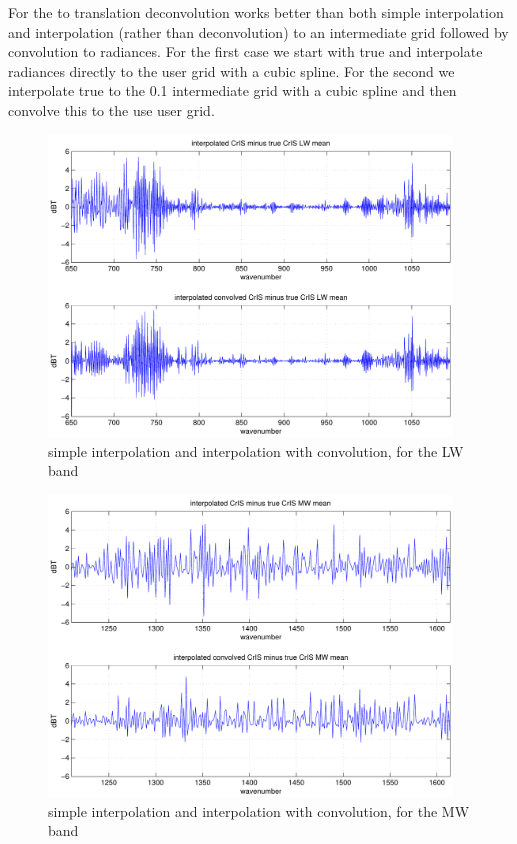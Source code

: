\documentclass[12pt]{article}
\begin{document}
For the {\airs} to {\cris} translation deconvolution works better
than both simple interpolation and interpolation (rather than
deconvolution) to an intermediate grid followed by convolution to
{\cris} radiances.  For the first case we start with true {\airs} and
interpolate radiances directly to the {\cris} user grid with a cubic
spline.  For the second we interpolate true {\airs} to the 0.1 {\wn}
intermediate grid with a cubic spline and then convolve this to the
use {\cris} user grid.

\begin{figure}
  \centering
  \includegraphics[height=8cm]{figures/airs_cris_intp_LW.pdf}
  \caption{simple interpolation and interpolation with convolution, 
    for the {\cris} LW band}
  \label{intpLW}
\end{figure}

\begin{figure}
  \centering
  \includegraphics[height=8cm]{figures/airs_cris_intp_MW.pdf}
  \caption{simple interpolation and interpolation with convolution, 
    for the {\cris} MW band}
  \label{intpMW}
\end{figure}
\end{document}
